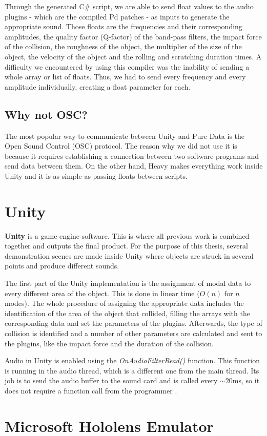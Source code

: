 Through the generated C\# script, we are able to send float values to the audio plugins - which are the compiled Pd patches - as inputs to generate the appropriate sound. Those floats are the frequencies and their corresponding amplitudes, the quality factor (Q-factor) of the band-pass filters, the impact force of the collision, the roughness of the object, the multiplier of the size of the object, the velocity of the object and the rolling and scratching duration times. A difficulty we encountered by using this compiler was the inability of sending a whole array or list of floats. Thus, we had to send every frequency and every amplitude individually, creating a float parameter for each.
 
\subsection{Why not OSC?}
The most popular way to communicate between Unity\textsuperscript{\textregistered} and Pure Data is the Open Sound Control (OSC) protocol. The reason why we did not use it is because it requires establishing a connection between two software programs and send data between them. On the other hand, Heavy makes everything work inside Unity\textsuperscript{\textregistered} and it is as simple as passing floats between scripts. 

\section{Unity\textsuperscript{\textregistered}}
\textbf{Unity\textsuperscript{\textregistered}} is a game engine software. This is where all previous work is combined together and outputs the final product. For the purpose of this thesis, several demonstration scenes are made inside Unity\textsuperscript{\textregistered} where objects are struck in several points and produce different sounds. 

The first part of the Unity\textsuperscript{\textregistered} implementation is the assignment of modal data to every different area of the object. This is done in linear time ($O(n)$ for $n$ modes). The whole procedure of assigning the appropriate data includes the identification of the area of the object that collided, filling the arrays with the corresponding data and set the parameters of the plugins. Afterwards, the type of collision is identified and a number of other parameters are calculated and sent to the plugins, like the impact force and the duration of the collision.

Audio in Unity\textsuperscript{\textregistered} is enabled using the \textit{OnAudioFilterRead()} function. This function is running in the audio thread, which is a different one from the main thread. Its job is to send the audio buffer to the sound card and is called every $\sim 20$ms, so it does not require a function call from the programmer \cite{bib:unity_doc}.

\section{Microsoft Hololens Emulator}

